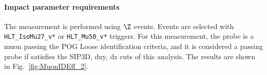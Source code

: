 \paragraph*{Impact parameter requirements}
The measurement is performed using $\Z$ events. Events are selected with \verb=HLT_IsoMu27_v*= or \verb=HLT_Mu50_v*= triggers.
For this measurement, the probe is a muon passing the POG Loose identification criteria,
and it is considered a passing probe if satisfies the SIP3D, dxy, dz cuts of this analysis.
%
The results are shown in Fig.~\ref{fig:MuonIDEff_2}.
